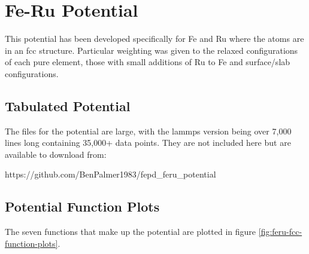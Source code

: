 \chapter{Fe-Ru Potential}
\label{chapter:appendix-ferupotential}

This potential has been developed specifically for Fe and Ru where the atoms are in an \acrshort{fcc} structure.  Particular weighting was given to the relaxed configurations of each pure element, those with small additions of Ru to Fe and surface/slab configurations.

\section{Tabulated Potential}

The files for the potential are large, with the \acrshort{lammps} version being over 7,000 lines long containing 35,000+ data points.  They are not included here but are available to download from:

https://github.com/BenPalmer1983/fepd\_feru\_potential



\clearpage
\FloatBarrier
\section{Potential Function Plots}

The seven functions that make up the potential are plotted in figure \ref{fig:feru-fcc-function-plots}.

